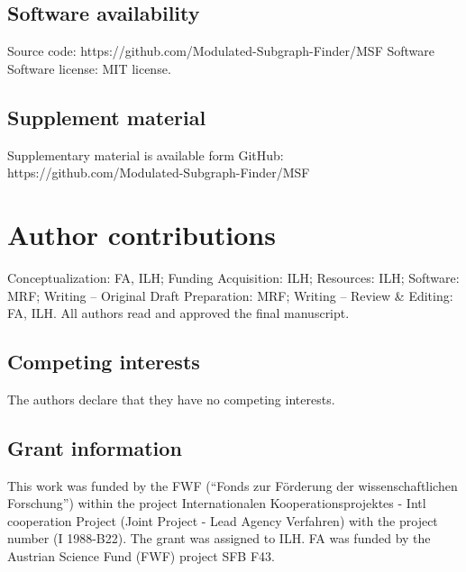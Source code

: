 \documentclass[10pt,a4paper,twocolumn]{article}
\begin{document}
	\subsection*{Software availability}
	
	\noindent
	Source code: \newline
	https://github.com/Modulated-Subgraph-Finder/MSF \newline Software
	Software license: MIT license.
	
	\subsection*{Supplement material}
	Supplementary material is available form GitHub: https://github.com/Modulated-Subgraph-Finder/MSF
	
	\section*{Author contributions}
	Conceptualization: FA, ILH; Funding Acquisition: ILH; Resources: ILH;
	Software: MRF; Writing – Original Draft Preparation: MRF; Writing – Review
	\& Editing: FA, ILH. All authors read and approved the final manuscript.
	
	\subsection*{Competing interests}
	
	The authors declare that they have no competing interests.
	
	\subsection*{Grant information}
	
	This work was funded by the FWF (“Fonds zur F{\"o}rderung der
	wissenschaftlichen Forschung”) within the project Internationalen
	Kooperationsprojektes - Intl cooperation Project (Joint Project - Lead
	Agency Verfahren) with the project number (I 1988-B22). The grant was
	assigned to ILH. FA was funded by the Austrian Science Fund (FWF) project
	SFB F43.
	
	
	{\small
		}
	
	\bigskip
	
	
	
	\begin{figure}
		\centering
		
	\end{figure}
	
\end{document}
